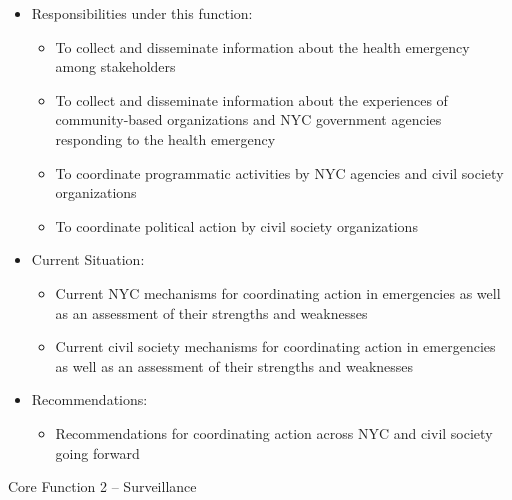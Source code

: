 \documentclass[
  letterpaper,
  DIV=11,
  numbers=noendperiod,
  oneside]{scrreprt}
\providecommand{\tightlist}{%
  \setlength{\itemsep}{0pt}\setlength{\parskip}{0pt}}\usepackage{longtable,booktabs,array}
\begin{document}
\begin{itemize}
\item
  Responsibilities under this function:

  \begin{itemize}
  \item
    To collect and disseminate information about the health emergency
    among stakeholders
  \item
    To collect and disseminate information about the experiences of
    community-based organizations and NYC government agencies responding
    to the health emergency
  \item
    To coordinate programmatic activities by NYC agencies and civil
    society organizations
  \item
    To coordinate political action by civil society organizations~
  \end{itemize}
\item
  Current Situation:

  \begin{itemize}
  \item
    Current NYC mechanisms for coordinating action in emergencies as
    well as an assessment of their strengths and weaknesses
  \item
    Current civil society mechanisms for coordinating action in
    emergencies as well as an assessment of their strengths and
    weaknesses
  \end{itemize}
\item
  Recommendations:

  \begin{itemize}
  \tightlist
  \item
    Recommendations for coordinating action across NYC and civil society
    going forward
  \end{itemize}
\end{itemize}

\hfill\break

Core Function 2 -- Surveillance~
\end{document}
